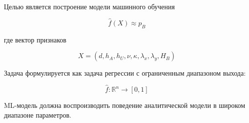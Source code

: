 \documentclass[%
]{ittmm}
\begin{document}
Целью является построение модели машинного обучения

\begin{equation}
\hat{f}(X) \approx p_B
\end{equation}

где вектор признаков

\begin{equation}
X = (d, h_A, h_U, \nu, \kappa, \lambda_x, \lambda_y, H_B)
\end{equation}



Задача формулируется как задача регрессии с ограниченным диапазоном выхода:

\begin{equation}
\hat{f}: \mathbb{R}^n \rightarrow [0,1]
\end{equation}

ML-модель должна воспроизводить поведение аналитической модели в широком диапазоне параметров.


\end{document}
